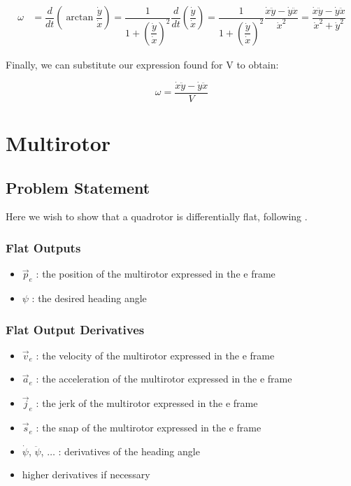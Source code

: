 \documentclass[10pt]{book}
\begin{document}
\begin{align*}
\omega &= \dfrac{d}{dt} \left(\arctan{\dfrac{\dot{y}}{\dot{x}}} \right) 
= \dfrac{1}{1 + \left(\dfrac{\dot{y}}{\dot{x}}\right)^2} \dfrac{d}{dt} 
    \left(\dfrac{\dot{y}}{\dot{x}}\right)
= \dfrac{1}{1 + \left(\dfrac{\dot{y}}{\dot{x}}\right)^2}  \dfrac{\dot{x}\ddot{y} - \dot{y}\ddot{x}}{\dot{x}^2}
= \dfrac{\dot{x}\ddot{y} - \dot{y}\ddot{x}}{\dot{x}^2 + \dot{y}^2}
\end{align*}

Finally, we can substitute our expression found for V to obtain:

$$\omega = \dfrac{\dot{x}\ddot{y} - \dot{y}\ddot{x}}{V}$$


\section{Multirotor}


\subsection{Problem Statement}

Here we wish to show that a quadrotor is differentially flat, following \cite{mellinger2012}.

\subsubsection*{Flat Outputs}
\begin{itemize}
    \item $\vec{p}_e$ : the position of the multirotor expressed in the e frame
    \item $\psi$ : the desired heading angle

\end{itemize}

\subsubsection*{Flat Output Derivatives}
\begin{itemize}
    \item $\vec{v}_e$ : the velocity of the multirotor expressed in the e frame
    \item $\vec{a}_e$ : the acceleration of the multirotor expressed in the e frame
    \item $\vec{j}_e$ : the jerk of the multirotor expressed in the e frame
    \item $\vec{s}_e$ : the snap of the multirotor expressed in the e frame
    \item $\dot{\psi}$, $\ddot{\psi}$, $\ldots{}$ : derivatives of the heading angle
    \item higher derivatives if necessary
\end{itemize}
\end{document}
